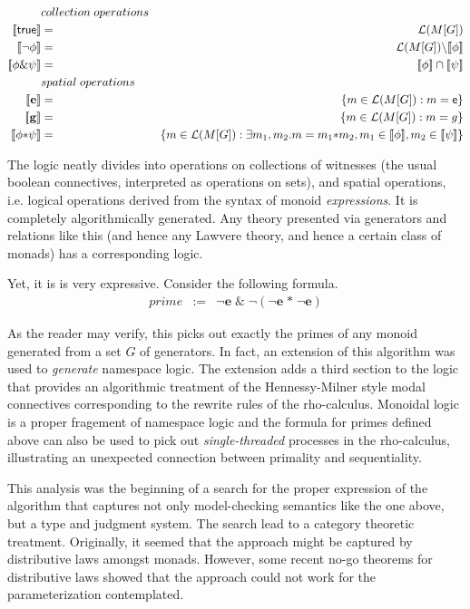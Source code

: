 \begin{eqnarray*}
  & collection \; operations & \\
  \meaningof{\mathsf{true}} & = & \mathcal{L}(M[G]) \\
  \meaningof{\neg \phi} & = & \mathcal{L}(M[G]) \backslash \meaningof{\phi} \\
  \meaningof{\phi \& \psi} & = & \meaningof{\phi} \cap \meaningof{\psi} \\
  & spatial \; operations & \\
  \meaningof{\mathbf{e}} & = & \{ m \in \mathcal{L}(M[G]) : m = \mathsf{e} \} \\
  \meaningof{\mathbf{g}} & = & \{ m \in \mathcal{L}(M[G]) : m = g \} \\
  \meaningof{\phi \mathbf{*} \psi} & = & \{ m \in \mathcal{L}(M[G]) : \exists m_{1}, m_{2}.m = m_{1} \mathsf{*} m_{2}, m_{1} \in \meaningof{\phi}, m_{2} \in \meaningof{\psi} \}
\end{eqnarray*}

The logic neatly divides into operations on collections of witnesses
(the usual boolean connectives, interpreted as operations on sets),
and spatial operations, i.e. logical operations derived from the
syntax of monoid \emph{expressions}. It is completely algorithmically
generated. Any theory presented via generators and relations like this
(and hence any Lawvere theory, and hence a certain class of monads)
has a corresponding logic.

Yet, it is is very expressive. Consider the following formula.
\begin{eqnarray*}
  prime & := & \neg \mathbf{e} \; \& \; \neg (\neg \mathbf{e} \; \mathbf{*}\; \neg \mathbf{e})
\end{eqnarray*}

As the reader may verify, this picks out exactly the primes of any
monoid generated from a set $G$ of generators. In fact, an extension
of this algorithm was used to \emph{generate} namespace logic. The
extension adds a third section to the logic that provides an
algorithmic treatment of the Hennessy-Milner style modal connectives
corresponding to the rewrite rules of the rho-calculus. Monoidal logic
is a proper fragement of namespace logic and the formula for primes
defined above can also be used to pick out \emph{single-threaded}
processes in the rho-calculus, illustrating an unexpected connection
between primality and sequentiality.

This analysis was the beginning of a search for the proper expression
of the algorithm that captures not only model-checking semantics like
the one above, but a type and judgment system. The search lead to a
category theoretic treatment. Originally, it seemed that the approach
might be captured by distributive laws amongst monads. However, some
recent no-go theorems for distributive laws showed that the approach
could not work for the parameterization contemplated.

